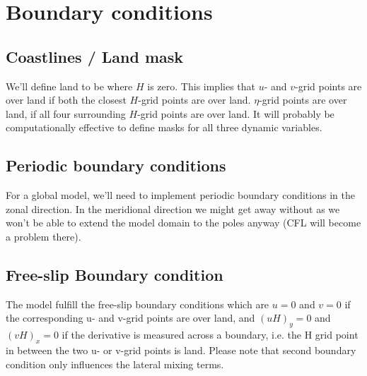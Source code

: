 \documentclass[a4paper]{article}
\begin{document}

\section{Boundary conditions}


\subsection{Coastlines / Land mask}
We'll define land to be where $H$ is zero. This implies that $u$- and $v$-grid
points are over land if both the closest $H$-grid points are over land.
$\eta$-grid points are over land, if all four surrounding $H$-grid points are over land.
It will probably be computationally effective to define masks for all three dynamic variables.


\subsection{Periodic boundary conditions}
For a global model, we'll need to implement periodic boundary conditions in the zonal
direction.  In the meridional direction we might get away without as we won't be able 
to extend the model domain to the poles anyway (CFL will become a problem there).

\subsection{Free-slip Boundary condition}
\label{subs:free-slip}
The model fulfill the free-slip boundary conditions which are $u=0$ and $v=0$ if the 
corresponding u- and v-grid points are over land, and $(uH)_y=0$ and $(vH)_x=0$ if the derivative is measured
across a boundary, i.e. the H grid point in between the two u- or v-grid points is land. Please note that
second boundary condition only influences the lateral mixing terms.

\end{document}
